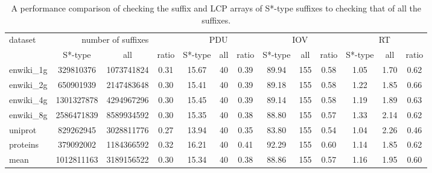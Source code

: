 \documentclass[10pt,journal,compsoc]{IEEEtran}
\begin{document}
	
	
\renewcommand\arraystretch{1.3}
\begin{table}
	\caption{A performance comparison of checking the suffix and LCP arrays of S*-type suffixes to checking that of all the suffixes.}
	\label{tbl:2}
	\centering
	\begin{tabular}{|l|c|c|c|c|c|c|c|c|c|c|c|c|}
		\hline
		\multirow{2}{*}{dataset} & \multicolumn{3}{|c|}{number of suffixes} & \multicolumn{3}{|c|}{PDU} & \multicolumn{3}{|c|}{IOV} & \multicolumn{3}{|c|}{RT} \\\cline{2-13}
						 & S*-type & all & ratio & S*-type & all & ratio & S*-type & all & ratio & S*-type & all & ratio \\\hline
		enwiki\_1g & 329810376 & 1073741824 & 0.31 & 15.67 & 40 & 0.39 & 89.94 & 155 & 0.58 & 1.05 & 1.70 & 0.62 \\\hline
		enwiki\_2g & 650901939 & 2147483648 & 0.30 & 15.41 & 40 & 0.39 & 89.18 & 155 & 0.58 & 1.22 & 1.85 & 0.66 \\\hline
		enwiki\_4g & 1301327878 & 4294967296 & 0.30 & 15.45 & 40 & 0.39 & 89.14 & 155 & 0.58 & 1.19 & 1.89 & 0.63 \\\hline
		enwiki\_8g & 2586471839 & 8589934592 & 0.30 & 15.35 & 40 & 0.38 & 88.80 & 155 & 0.57 & 1.33 & 2.14 & 0.62 \\\hline	
		uniprot & 829262945 & 3028811776 & 0.27 & 13.94 & 40 & 0.35 & 83.80 & 155 & 0.54 & 1.04 & 2.26 & 0.46 \\\hline
		proteins & 379092002 & 1184366592 & 0.32 & 16.21 & 40 & 0.41 & 92.29 & 155 & 0.60 & 1.14 & 1.85 & 0.62	\\\hline
		mean & 1012811163 & 3189156522 & 0.30 & 15.34 & 40 & 0.38 & 88.86 & 155 & 0.57 & 1.16 & 1.95 & 0.60 \\\hline
	\end{tabular}
\end{table}

\end{document}
